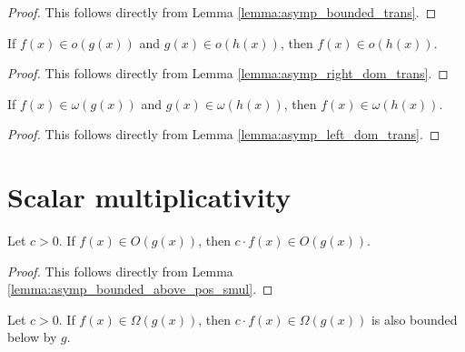 \begin{proof}
    \leanok
    This follows directly from Lemma \ref{lemma:asymp_bounded_trans}.
\end{proof}

\begin{lemma}
    \label{lemma:small_o_trans}
    \leanok
    If $f(x) \in o(g(x))$ and $g(x) \in o(h(x))$, then $f(x) \in o(h(x))$. 
\end{lemma}

\begin{proof}
    \leanok
    This follows directly from Lemma \ref{lemma:asymp_right_dom_trans}.
\end{proof}

\begin{lemma}
    \label{lemma:small_omega_trans}
    \leanok
    If $f(x) \in \omega(g(x))$ and $g(x) \in \omega(h(x))$, then $f(x) \in \omega(h(x))$.
\end{lemma}

\begin{proof}
    \leanok
    This follows directly from Lemma \ref{lemma:asymp_left_dom_trans}.
\end{proof}


\section{Scalar multiplicativity}

\begin{lemma}
    \label{lemma:big_o_pos_smul}
    \leanok
    Let $c > 0$. If $f(x) \in O(g(x))$, then $c \cdot f(x) \in O(g(x))$.
\end{lemma}

\begin{proof}
    \leanok
    This follows directly from Lemma \ref{lemma:asymp_bounded_above_pos_smul}.
\end{proof}

\begin{lemma}
    \label{lemma:big_omega_pos_smul}
    \leanok
    Let $c > 0$. If $f(x) \in \Omega(g(x))$, then $c \cdot f(x) \in \Omega(g(x))$ is also bounded
    below by $g$.
\end{lemma}

